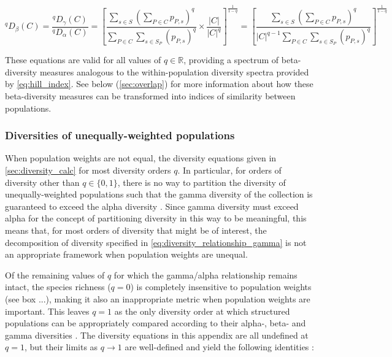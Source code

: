 \begin{equation}
^qD_\beta(C) = \frac{^qD_\gamma(C)}{^qD_\alpha(C)}
= \left[
\frac{\displaystyle\sum_{s \in S}\left(\sum_{P \in C} p_{P,s}\right)^q}{\displaystyle \sum_{P \in C}\sum_{s \in S_P} (p_{P,s})^q}
\times
\frac{\displaystyle |C|}{\displaystyle|C|^q}
\right]^\frac{1}{1-q}
= \left[
\frac{\displaystyle\sum_{s \in S}\left(\sum_{P \in C} p_{P,s}\right)^q}{\displaystyle |C|^{q-1} \sum_{P \in C}\sum_{s \in S_P} (p_{P,s})^q}
\right]^\frac{1}{1-q}
\label{eq:diversity_beta_even}
\end{equation} %

These equations are valid for all values of $q \in \mathbb{R}$, providing a spectrum of beta-diversity measures analogous to the within-population diversity spectra provided by \autoref{eq:hill_index}. See below (\autoref{sec:overlap}) for more information about how these beta-diversity measures can be transformed into indices of similarity between populations.

\subsubsection{Diversities of unequally-weighted populations}

When population weights are not equal, the diversity equations given in \autoref{sec:diversity_calc} for most diversity orders $q$. In particular, for orders of diversity other than $q \in \{0,1\}$, there is no way to partition the diversity of unequally-weighted populations such that the gamma diversity of the collection is guaranteed to exceed the alpha diversity \citep{jost2007partitioning}. Since gamma diversity must exceed alpha for the concept of partitioning diversity in this way to be meaningful, this means that, for most orders of diversity that might be of interest, the decomposition of diversity specified in \autoref{eq:diversity_relationship_gamma} is not an appropriate framework when population weights are unequal.

Of the remaining values of $q$ for which the gamma/alpha relationship remains intact, the species richness ($q=0$) is completely insensitive to population weights (see box ...), making it also an inappropriate metric when population weights are important. This leaves $q=1$ as the only diversity order at which structured populations can be appropriately compared according to their alpha-, beta- and gamma diversities \citep{jost2007partitioning}. The diversity equations in this appendix are all undefined at $q = 1$, but their limits as $q \to 1$ are well-defined and yield the following identities \citep{jost2007partitioning}:

